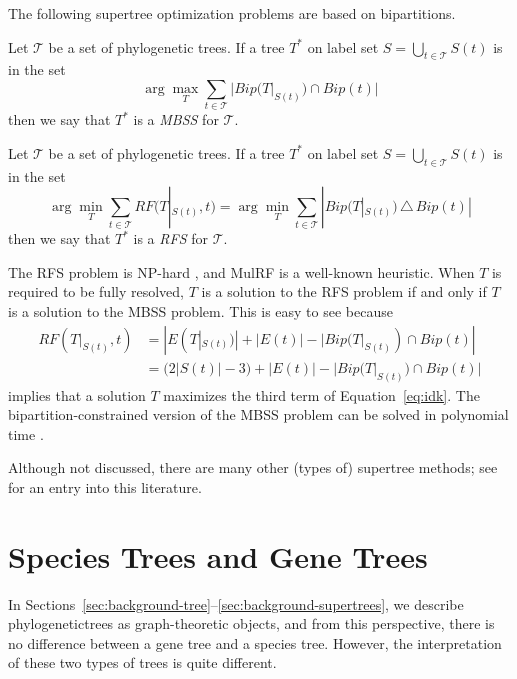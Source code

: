 The following supertree optimization problems are based on bipartitions.

\begin{definition}
Let $\mathcal{T}$ be a set of phylogenetic trees.
If a tree $T^*$ on label set $S = \bigcup_{t \in \mathcal{T}} S(t)$ is in the set
\begin{equation}
	\arg \max_T \sum_{t \in \mathcal{T}}  | Bip(T |_{S(t)}) \cap Bip(t) |
\end{equation}
then we say that $T^*$ is a \emph{\gls{MBSS}} for $\mathcal{T}$.
\end{definition}

\begin{definition}
Let $\mathcal{T}$ be a set of phylogenetic trees.
If a tree $T^*$ on label set $S = \bigcup_{t \in \mathcal{T}} S(t)$ is in the set
\begin{equation}
	\arg \min_T \sum_{t \in \mathcal{T}} RF(T |_{S(t)}, t) = \arg \min_T \sum_{t \in \mathcal{T}} | Bip(T |_{S(t)}) \, \triangle \, Bip(t) |
\end{equation}
then we say that $T^*$ is a \emph{\gls{RFS}} for $\mathcal{T}$.
\end{definition}
The RFS problem is NP-hard \cite{bansal2010robinson}, and MulRF \cite{chaudhary2013inferring, chaudhary2014mulrf} is a well-known heuristic.
When $T$ is required to be fully resolved, $T$ is a solution to the RFS problem if and only if $T$ is a solution to the MBSS problem.
This is easy to see because
\begin{align}
	 RF(T |_{S(t)}, t) 
	 &= |E(T |_{S(t)})| + |E(t)| - | Bip(T |_{S(t)}) \cap Bip(t) | \\
	 &= \big( 2 |S(t)| - 3 \big) + |E(t)| - | Bip(T |_{S(t)}) \cap Bip(t) | \label{eq:idk}
\end{align}
implies that a solution $T$ maximizes the third term of Equation~\ref{eq:idk}.
The bipartition-constrained version of the MBSS problem can be solved in polynomial time \cite{vachaspati2015fastrfs}.

Although not discussed, there are many other (types of) supertree methods; see \cite{bininda2004phylogenetic, warnow2018supertree, brinkmeyer2001polynomial} for an entry into this literature.

\section{Species Trees and Gene Trees}
\label{sec:background-trees-2}
In Sections~\ref{sec:background-tree}--\ref{sec:background-supertrees}, we describe \glspl{phylogenetictree} as graph-theoretic objects, and from this perspective, there is no difference between a gene tree and a species tree. 
However, the interpretation of these two types of trees is quite different.


